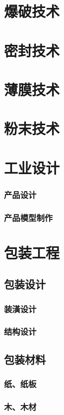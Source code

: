 \documentclass[UTF8]{../../ApplicationUniverse}
\begin{document}
\section{爆破技术}
\section{密封技术}
\section{薄膜技术}
\section{粉末技术}
\section{工业设计}
    \subsubsection{产品设计}
    \subsubsection{产品模型制作}
\section{包装工程}
    \subsection{包装设计}
        \subsubsection{装潢设计}
        \subsubsection{结构设计}
    \subsection{包装材料}
        \subsubsection{纸、纸板}
        \subsubsection{木、木材}
\end{document}
